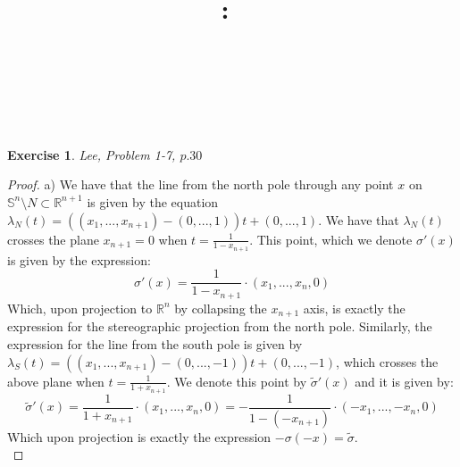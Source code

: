 \documentclass{article}
\title{
    \vspace{2in}
    \textmd{\textbf{\hmwkClass:\ \hmwkTitle}}\\
    \vspace{0.1in}
    \textmd{\hmwkDueDate} \\
    \vspace{0.2in}\large{\textit{\hmwkClassInstructor\  }}
    \vspace{2in}
}
\author{\hmwkAuthorName}
\date{}
\newcommand{\bb}[1]{\mathbb{#1}}
\newtheorem{exercise}{Exercise}
\begin{document}
\maketitle

\newpage
\begin{exercise}
Lee, Problem 1-7, $p.30$  
\end{exercise}
\begin{proof}
  a) We have that the line from the north pole through any point $x$ on $\bb{S}^{n} \setminus N \subset \bb{R}^{n+1}$ is given by the equation $\lambda_{N}(t) = ((x_{1},...,x_{n+1})- (0,...,1))t + (0,...,1)$. We have that $\lambda_{N}(t)$ crosses the plane $x_{n+1} = 0$ when $t = \frac{1}{1-x_{n+1}}$. This point, which we denote $\sigma'(x)$ is given by the expression:
  \[
    \sigma'(x) = \frac{1}{1-x_{n+1}} \cdot (x_{1},...,x_{n}, 0)
  \]
  Which, upon projection to $\bb{R}^{n}$ by collapsing the $x_{n+1}$ axis, is exactly the expression for the stereographic projection from the north pole. Similarly, the expression for the line from the south pole is given by $\lambda_{S}(t) = ((x_{1},...,x_{n+1}) - (0,...,-1))t + (0,...,-1)$, which crosses the above plane when $t = \frac{1}{1+x_{n+1}}$. We denote this point by $\widetilde{\sigma}'(x)$ and it is given by:
  \[
   \widetilde{\sigma}'(x) = \frac{1}{1+x_{n+1}} \cdot (x_{1},...,x_{n}, 0) = - \frac{1}{1 - (-x_{n+1})} \cdot (-x_{1},...,-x_{n}, 0)
 \]
 Which upon projection is exactly the expression $-\sigma(-x) = \widetilde{\sigma}$. \\


\end{proof}
\end{document}
